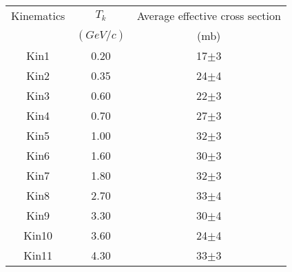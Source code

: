 \begin{center}
\begin{tabular}{||c|c|c||}\hline
 Kinematics & $T_k$ & Average effective cross section \\
 & $(GeV/c)$ & (mb)\\\hline
Kin1 & 0.20 &17$\pm$3 \\
Kin2 & 0.35 &24$\pm$4 \\
Kin3 & 0.60 &22$\pm$3 \\
Kin4 & 0.70 &27$\pm$3 \\
Kin5 & 1.00 &32$\pm$3 \\
Kin6 & 1.60 &30$\pm$3 \\
Kin7 & 1.80 &32$\pm$3 \\
Kin8 & 2.70 &33$\pm$4 \\
Kin9 & 3.30 &30$\pm$4 \\
Kin10 & 3.60 &24$\pm$4 \\
Kin11 & 4.30 &33$\pm$3 \\\hline
\end{tabular}
\end{center}